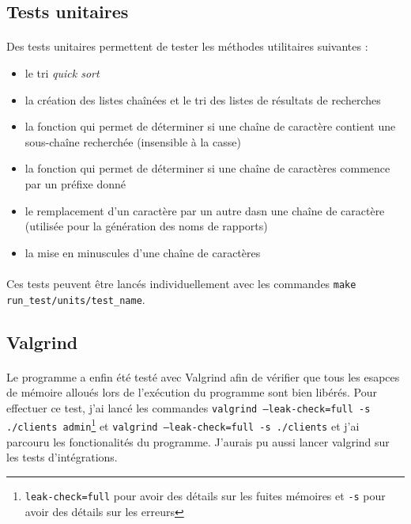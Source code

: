 \documentclass{article}
\begin{document}
    \subsection{Tests unitaires}
    \paragraph{}
    Des tests unitaires permettent de tester les méthodes utilitaires suivantes :
    \begin{itemize}[label=$\bullet$]
        \item le tri \emph{quick sort}
        \item la création des listes chaînées et le tri des listes de résultats de recherches
        \item la fonction qui permet de déterminer si une chaîne de caractère contient une sous-chaîne recherchée (insensible à la casse)
        \item la fonction qui permet de déterminer si une chaîne de caractères commence par un préfixe donné
        \item le remplacement d'un caractère par un autre dasn une chaîne de caractère (utilisée pour la génération des noms de rapports)
        \item la mise en minuscules d'une chaîne de caractères
    \end{itemize}

    \paragraph{}
    Ces tests peuvent être lancés individuellement avec les commandes \texttt{make run\_test/units/test\_name}.


    \subsection{Valgrind}
    \paragraph{}
    Le programme a enfin été testé avec Valgrind afin de vérifier que tous les esapces de mémoire alloués lors de l'exécution du programme sont bien libérés. Pour effectuer ce test, j'ai lancé les commandes \texttt{valgrind --leak-check=full -s ./clients admin}\footnote{\texttt{leak-check=full} pour avoir des détails sur les fuites mémoires et \texttt{-s} pour avoir des détails sur les erreurs} et \texttt{valgrind --leak-check=full -s ./clients} et j'ai parcouru les fonctionalités du programme. J'aurais pu aussi lancer valgrind sur les tests d'intégrations.
\end{document}

